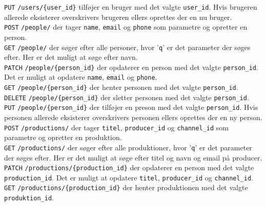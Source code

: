 \texttt{PUT} \texttt{/users/\{user\_id\}} tilføjer en bruger med det valgte \texttt{user\_id}. Hvis brugeren allerede eksisterer overskrivers brugeren ellers oprettes der en nu bruger.\\

\texttt{POST} \texttt{/people/} der tager \texttt{name}, \texttt{email} og \texttt{phone} som parametre og opretter en person.\\


\texttt{GET} \texttt{/people/} der søger efter alle personer, hvor '\texttt{q}' er det parameter der søges efter. Her er det muligt at søge efter navn.\\


\texttt{PATCH} \texttt{/people/\{person\_id\}} der opdaterer en person med det valgte \texttt{person\_id}. Det er muligt at opdatere \texttt{name}, \texttt{email} og \texttt{phone}.\\


\texttt{GET} \texttt{/people/\{person\_id\}} der henter personen med det valgte \texttt{person\_id}.\\


\texttt{DELETE} \texttt{/people/\{person\_id\}} der sletter personen med det valgte \texttt{person\_id}.\\


\texttt{PUT} \texttt{/people/\{person\_id\}} der tilføjer en preson med det valgte \texttt{person\_id}. Hvis personen allerede eksisterer overskrivers personen ellers oprettes der en ny person.\\

\texttt{POST} \texttt{/productions/} der tager \texttt{titel}, \texttt{producer\_id} og \texttt{channel\_id} som parametre og opretter en produktion.\\


\texttt{GET} \texttt{/productions/} der søger efter alle produktioner, hvor '\texttt{q}' er det parameter der søges efter. Her er det muligt at søge efter titel og navn og email på producer.\\


\texttt{PATCH} \texttt{/productions/\{production\_id\}} der opdaterer en person med det valgte \texttt{production\_id}. Det er muligt at opdatere \texttt{titel}, \texttt{producer\_id} og \texttt{channel\_id}.\\


\texttt{GET} \texttt{/productions/\{production\_id\}} der henter produktionen med det valgte \texttt{produktion\_id}.\\


